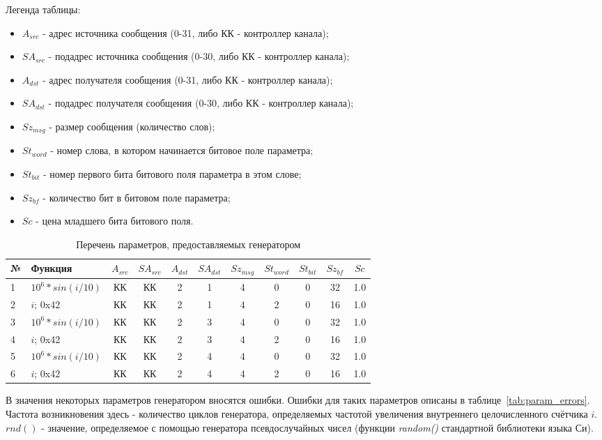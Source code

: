 Легенда таблицы:

\begin{itemize}
 \item $A_{src}$ - адрес источника сообщения (0-31, либо КК - контроллер 
канала);
 \item $SA_{src}$ - подадрес источника сообщения (0-30, либо КК - контроллер 
канала);
 \item $A_{dst}$ - адрес получателя сообщения (0-31, либо КК - контроллер 
канала);
 \item $SA_{dst}$ - подадрес получателя сообщения (0-30, либо КК - контроллер 
канала);
 \item $Sz_{msg}$ - размер сообщения (количество слов);
 \item $St_{word}$ - номер слова, в котором начинается битовое поле параметра;
 \item $St_{bit}$ - номер первого бита битового поля параметра в этом слове;
 \item $Sz_{bf}$ - количество бит в битовом поле параметра;
 \item $Sc$ - цена младшего бита битового поля.
\end{itemize}

\begin{table}[H]
\centering
\begin{tabular}{|l|l|*{9}{c|}}
\hline
 № & Функция & $A_{src}$ & $SA_{src}$ & $A_{dst}$ & $SA_{dst}$ & $Sz_{msg}$ & 
$St_{word}$ & $St_{bit}$ & $Sz_{bf}$ & $Sc$ \\
\hline
1 & $10^6 * sin(i / 10)$ & КК & КК & 2 & 1 & 4 & 0 & 0 & 32 & 1.0 \\
2 & $i$; 0x42 & КК & КК & 2 & 1 & 4 & 2 & 0 & 16 & 1.0 \\
3 & $10^6 * sin(i / 10)$ & КК & КК & 2 & 3 & 4 & 0 & 0 & 32 & 1.0 \\
4 & $i$; 0x42 & КК & КК & 2 & 3 & 4 & 2 & 0 & 16 & 1.0 \\
5 & $10^6 * sin(i / 10)$ & КК & КК & 2 & 4 & 4 & 0 & 0 & 32 & 1.0 \\
6 & $i$; 0x42 & КК & КК & 2 & 4 & 4 & 2 & 0 & 16 & 1.0 \\
\hline 
\end{tabular}
\caption{Перечень параметров, предоставляемых генератором}
\label{tab:params}
\end{table}

В значения некоторых параметров генератором вносятся ошибки. Ошибки 
для таких параметров описаны в таблице~\ref{tab:param_errors}. Частота 
возникновения здесь - количество циклов генератора, определяемых частотой 
увеличения внутреннего целочисленного счётчика $i$. $rnd()$ - значение, 
определяемое с помощью генератора псевдослучайных чисел (функции 
\textit{random()} стандартной библиотеки языка Си).

